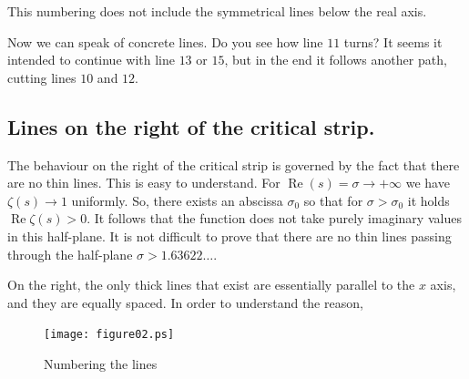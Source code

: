 \documentclass[a4paper]{amsart}
\numberwithin{equation}{section}
\def\Re{\operatorname{\text{Re}}}
\begin{document}
\begin{large}
This numbering does not include the symmetrical lines below the real axis.

Now we can speak of concrete lines. Do you see how line $11$ turns? It seems it
intended to continue with line $13$ or $15$, but in the end it follows another
path, cutting lines $10$ and $12$.



\subsection{Lines on the right of the critical strip.} 
The
behaviour on the right of the critical strip is governed by the
fact that there are no thin lines. This is easy to understand. For
$\Re (s)=\sigma \to +\infty$ we have
$\zeta(s)\to 1$ uniformly. So, there exists an abscissa $\sigma_0$
so that for $\sigma >\sigma_0$ it holds $\Re \zeta(s)>0$. It
follows that the function does not take purely imaginary values in
this half-plane. It is not difficult to prove that there are no
thin lines passing through the half-plane $\sigma>1.63622\dots$.

\medskip

On the right, the only thick lines that exist are essentially parallel to the
$x$ axis, and they are equally spaced. In order to understand the reason, 
\goodbreak

\end{large}

\begin{figure}
\texttt{[image: figure02.ps]}
\caption{Numbering the lines}
\end{figure}
\end{document}
